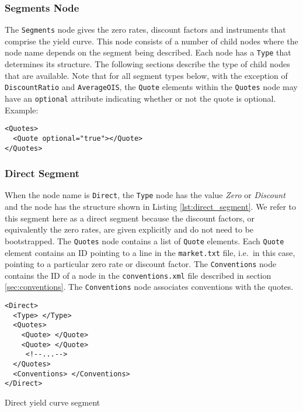 \subsubsection*{Segments Node} \label{ss:segments_node}
The \lstinline!Segments! node gives the zero rates, discount factors and instruments that comprise the yield curve. This
node consists of a number of child nodes where the node name depends on the segment being described. Each node has a
\lstinline!Type! that determines its structure. The following sections describe the type of child nodes that are
available. Note that for all segment types below, with the exception of \lstinline!DiscountRatio! and \lstinline!AverageOIS!, the 
\lstinline!Quote! elements within the \lstinline!Quotes! node may have an \lstinline!optional! attribute indicating whether or
not the quote is optional. Example:
\begin{verbatim}
<Quotes>
  <Quote optional="true"></Quote>
</Quotes>
\end{verbatim}

\subsubsection*{Direct Segment}
When the node name is \lstinline!Direct!, the \lstinline!Type! node has the value \emph{Zero} or \emph{Discount} and the
node has the structure shown in Listing \ref{lst:direct_segment}. We refer to this segment here as a direct segment
because the discount factors, or equivalently the zero rates, are given explicitly and do not need to be
bootstrapped. The \lstinline!Quotes! node contains a list of \lstinline!Quote! elements. Each \lstinline!Quote! element
contains an ID pointing to a line in the {\tt market.txt} file, i.e.\ in this case, pointing to a particular zero rate
or discount factor. The \lstinline!Conventions! node contains the ID of a node in the {\tt conventions.xml} file
described in section \ref{sec:conventions}. The \lstinline!Conventions! node associates conventions with the quotes.

\begin{listing}[H]
\begin{verbatim}
<Direct>
  <Type> </Type>
  <Quotes>
    <Quote> </Quote>
    <Quote> </Quote>
     <!--...-->
  </Quotes>
  <Conventions> </Conventions>
</Direct>
\end{verbatim}
\caption{Direct yield curve segment}
\label{lst:direct_segment}
\end{listing}



